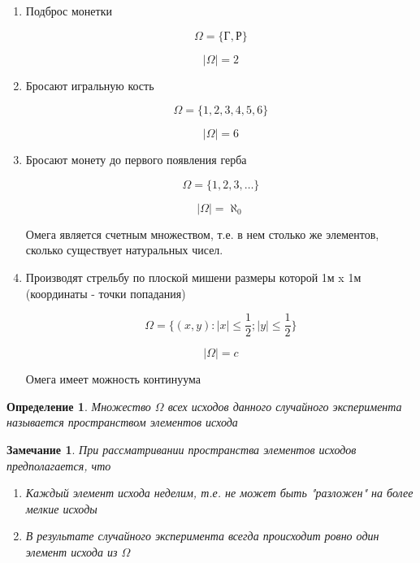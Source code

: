 \documentclass[a4paper, 14pt]{report}
\newtheorem{defenition}{Определение}[chapter]
\newtheorem{note}{Замечание}[chapter]
\begin{document}
    \begin{enumerate}
        \item Подброс монетки

            $$
            \Omega = \{ \text{Г}, \text{Р}\}
            $$

            $$
            |\Omega| = 2
            $$

        \item Бросают игральную кость

            $$
            \Omega = \{ 1, 2, 3, 4, 5, 6 \}
            $$

            $$
            |\Omega| = 6
            $$

        \item Бросают монету до первого появления герба

            $$
            \Omega = \{ 1, 2, 3, \dots \}
            $$

            $$
            |\Omega| = \aleph_0
            $$

            Омега является счетным множеством, т.е. в нем столько же элементов, сколько существует натуральных чисел.

        \item Производят стрельбу по плоской мишени размеры которой 1м x 1м (координаты - точки попадания)

            $$
            \Omega = \{ (x,y) : |x| \le \frac{1}{2}; |y| \le \frac{1}{2} \}
            $$

            $$
            |\Omega| = c
            $$

            Омега имеет можность континуума
    \end{enumerate}

    \begin{defenition}
        Множество $\Omega$ всех исходов данного случайного эксперимента называется пространством элементов исхода
    \end{defenition}

    \begin{note}
        При рассматривании пространства элементов исходов предполагается, что
        \begin{enumerate}
            \item Каждый элемент исхода неделим, т.е. не может быть "разложен" на более мелкие исходы
            \item В результате случайного эксперимента всегда происходит ровно один элемент исхода из $\Omega$
        \end{enumerate}
    \end{note}
\end{document}
